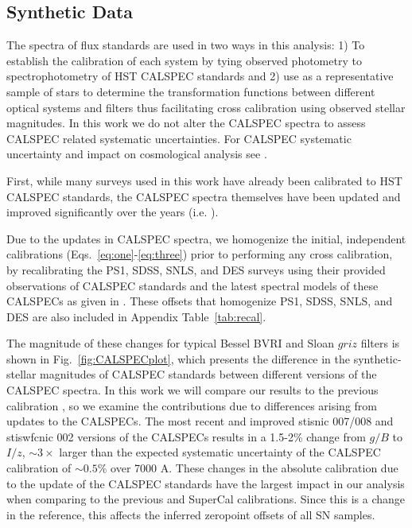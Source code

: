 \documentclass[twocolumn]{aastex63}
\newcommand{\blue}{\color{black}}
\newcommand{\red}{\color{black}}
\begin{document}
\subsection{Synthetic Data}
\label{sec:CALSPEC}
The spectra of flux standards are used in two ways in this analysis: 1) To establish the calibration of each system by tying observed photometry to spectrophotometry of HST CALSPEC standards and 2) use as a representative sample of stars to determine the transformation functions between different optical systems and filters thus facilitating cross calibration using observed stellar magnitudes. { In this work we do not alter the CALSPEC spectra to assess CALSPEC related systematic uncertainties. For CALSPEC systematic uncertainty and impact on cosmological analysis see \cite{pantheonpluscosmo}.}

First, while many surveys used in this work have already been calibrated to HST CALSPEC standards, the CALSPEC spectra themselves have been updated and improved {\blue significantly over the years (i.e. \citealt{bohlin96,bohlin07,bohlin14,bohlin15,bohlin19,Bohlin21}).} 


{ Due to the updates in CALSPEC spectra, we homogenize the initial, independent calibrations (Eqs.~\ref{eq:one}-\ref{eq:three}) prior to performing any cross calibration,} by recalibrating the PS1, SDSS, SNLS, and DES surveys using their provided observations of CALSPEC standards and the latest spectral models of these CALSPECs as given in \cite{Bohlin21}.  {\red These offsets that homogenize PS1, SDSS, SNLS, and DES are also included in Appendix Table~\ref{tab:recal}.}


{\blue The magnitude of these changes for typical Bessel BVRI and Sloan $griz$ filters is shown in Fig.~\ref{fig:CALSPECplot}, which presents the difference in the synthetic-stellar magnitudes of CALSPEC standards between different versions of the CALSPEC spectra. In this work we will compare our results to the previous calibration \citep{Betoule2014}, so we examine the contributions due to differences arising from updates to the CALSPECs. The most recent} and improved stisnic 007/008 and stiswfcnic 002 versions of the CALSPECs results in a 1.5-2\% change from $g/B$ to $I/z$, $\sim3\times$ larger than the expected systematic uncertainty of the CALSPEC calibration of $\sim0.5\%$ over 7000 A.  {\blue These changes in the absolute calibration due to the update of the CALSPEC standards have the largest impact in our analysis when comparing to the previous \cite{Betoule2014} and SuperCal calibrations. Since this is a change in the reference, this affects the inferred zeropoint offsets of all SN samples.}
\end{document}
